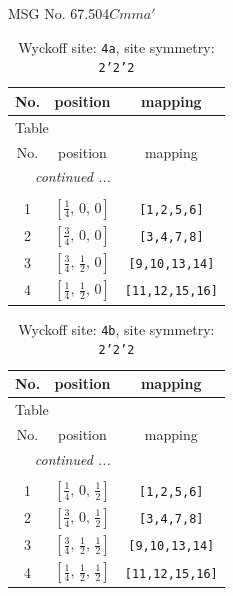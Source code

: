 \documentclass[fleqn,8pt]{jsarticle}
\begin{document}
\setcounter{MaxMatrixCols}{32}

\renewcommand{\tablename}{Table~}
\renewcommand{\figurename}{Figure~}
\begin{center}
\LARGE
MSG No. 67.504\quad$Cmma'$
\end{center}
\renewcommand{\arraystretch}{1.2}
\begin{longtable}{ccc}
\caption{Wyckoff site: {\tt 4a}, site symmetry: {\tt 2'2'2}}
 \\
 \hline \hline
No. & position & mapping \\ \hline \endfirsthead

\multicolumn{2}{l}{\tablename\ \thetable{}} \\
 \hline \hline
No. & position & mapping \\ \hline \endhead

 \hline \hline
\multicolumn{2}{r}{\footnotesize\it continued ...} \\ \endfoot

 \hline \hline
\multicolumn{2}{r}{} \\ \endlastfoot

1 & $\left[ \frac{1}{4},\, 0,\, 0 \right]$ & {\tt [1,2,5,6]} \\ \hline
2 & $\left[ \frac{3}{4},\, 0,\, 0 \right]$ & {\tt [3,4,7,8]} \\ \hline
3 & $\left[ \frac{3}{4},\, \frac{1}{2},\, 0 \right]$ & {\tt [9,10,13,14]} \\ \hline
4 & $\left[ \frac{1}{4},\, \frac{1}{2},\, 0 \right]$ & {\tt [11,12,15,16]} \\
\end{longtable}
\renewcommand{\arraystretch}{1.2}
\begin{longtable}{ccc}
\caption{Wyckoff site: {\tt 4b}, site symmetry: {\tt 2'2'2}}
 \\
 \hline \hline
No. & position & mapping \\ \hline \endfirsthead

\multicolumn{2}{l}{\tablename\ \thetable{}} \\
 \hline \hline
No. & position & mapping \\ \hline \endhead

 \hline \hline
\multicolumn{2}{r}{\footnotesize\it continued ...} \\ \endfoot

 \hline \hline
\multicolumn{2}{r}{} \\ \endlastfoot

1 & $\left[ \frac{1}{4},\, 0,\, \frac{1}{2} \right]$ & {\tt [1,2,5,6]} \\ \hline
2 & $\left[ \frac{3}{4},\, 0,\, \frac{1}{2} \right]$ & {\tt [3,4,7,8]} \\ \hline
3 & $\left[ \frac{3}{4},\, \frac{1}{2},\, \frac{1}{2} \right]$ & {\tt [9,10,13,14]} \\ \hline
4 & $\left[ \frac{1}{4},\, \frac{1}{2},\, \frac{1}{2} \right]$ & {\tt [11,12,15,16]} \\
\end{longtable}
\end{document}

